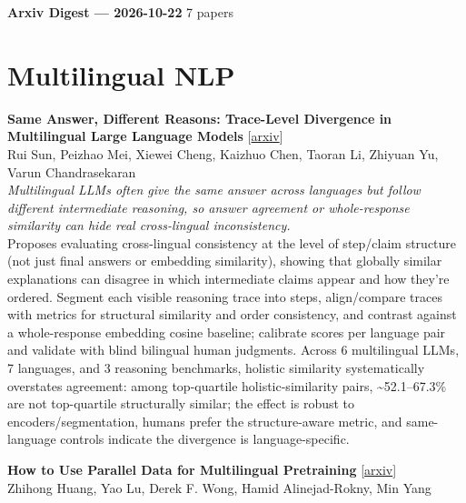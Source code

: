 \documentclass[12pt,letterpaper]{article}
\begin{document}
{\footnotesize\textbf{Arxiv Digest --- 2026-10-22} \hfill 7 papers}

\smallskip

\section*{Multilingual NLP}

{\small\textbf{Same Answer, Different Reasons: Trace-Level Divergence in Multilingual Large Language Models}} {\scriptsize[\href{https://arxiv.org/abs/2610.29092}{arxiv}]}\\
{\scriptsize Rui Sun, Peizhao Mei, Xiewei Cheng, Kaizhuo Chen, Taoran Li, Zhiyuan Yu, Varun Chandrasekaran}\\

{\small\textit{Multilingual LLMs often give the same answer across languages but follow different intermediate reasoning, so answer agreement or whole-response similarity can hide real cross-lingual inconsistency.}}\\[1pt]
{\footnotesize Proposes evaluating cross-lingual consistency at the level of step/claim structure (not just final answers or embedding similarity), showing that globally similar explanations can disagree in which intermediate claims appear and how they're ordered. Segment each visible reasoning trace into steps, align/compare traces with metrics for structural similarity and order consistency, and contrast against a whole-response embedding cosine baseline; calibrate scores per language pair and validate with blind bilingual human judgments. Across 6 multilingual LLMs, 7 languages, and 3 reasoning benchmarks, holistic similarity systematically overstates agreement: among top-quartile holistic-similarity pairs, \textasciitilde{}52.1--67.3\% are not top-quartile structurally similar; the effect is robust to encoders/segmentation, humans prefer the structure-aware metric, and same-language controls indicate the divergence is language-specific.}

\medskip

{\small\textbf{How to Use Parallel Data for Multilingual Pretraining}} {\scriptsize[\href{https://arxiv.org/abs/2610.28838}{arxiv}]}\\
{\scriptsize Zhihong Huang, Yao Lu, Derek F. Wong, Hamid Alinejad-Rokny, Min Yang}\\
\end{document}
